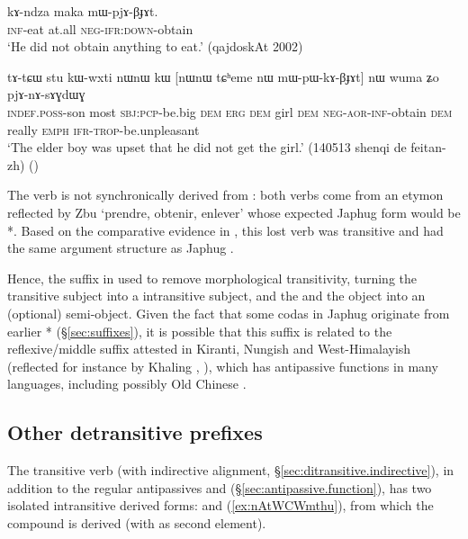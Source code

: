 \begin{exe}
\ex \label{ex:mWpjABJAt}
\gll kɤ-ndza maka mɯ-pjɤ-βɟɤt.   \\
\textsc{inf}-eat at.all \textsc{neg}-\textsc{ifr}:\textsc{down}-obtain \\
\glt `He did not obtain anything to eat.' (qajdoskAt 2002)
\end{exe}

\begin{exe}
\ex \label{ex:mWpWkABJAt}
\gll tɤ-tɕɯ stu kɯ-wxti nɯnɯ kɯ [nɯnɯ tɕʰeme nɯ mɯ-pɯ-kɤ-βɟɤt] nɯ wuma ʑo pjɤ-nɤ-sɤɣdɯɣ  \\
\textsc{indef}.\textsc{poss}-son most \textsc{sbj}:\textsc{pcp}-be.big \textsc{dem} \textsc{erg} \textsc{dem} girl \textsc{dem} \textsc{neg}-\textsc{aor}-\textsc{inf}-obtain \textsc{dem} really \textsc{emph} \textsc{ifr}-\textsc{trop}-be.unpleasant \\
\glt `The elder boy was upset that he did not get the girl.' (140513 shenqi de feitan-zh) ()
\end{exe}

The verb  is not synchronically derived from : both verbs come from an etymon reflected by Zbu  `prendre, obtenir, enlever' \citep[310]{gong18these} whose expected Japhug form would be *. Based on the comparative evidence in \citet[310--311]{gong18these}, this lost verb was transitive and had the same argument structure as Japhug . 
 
Hence, the  suffix in  used to remove morphological transitivity, turning the transitive subject into a intransitive subject, and the and the object into an (optional) semi-object. Given the fact that some  codas in Japhug originate from earlier * (§\ref{sec:suffixes}), it is possible that this  suffix is related to the reflexive/middle suffix attested in Kiranti, Nungish and West-Himalayish (reflected for instance by Khaling , \citealt{jacques16si}), which has antipassive functions in many languages, including possibly Old Chinese \citep{jacques20antipass}.
 
 \subsection{Other detransitive prefixes} \label{sec:CWmthu}
 The transitive verb  (with indirective alignment, §\ref{sec:ditransitive.indirective}), in addition to the regular antipassives  and  (§\ref{sec:antipassive.function}), has two isolated intransitive derived forms:  and   (\ref{ex:nAtWCWmthu}), from which the compound  is derived (with  as second element).
 
